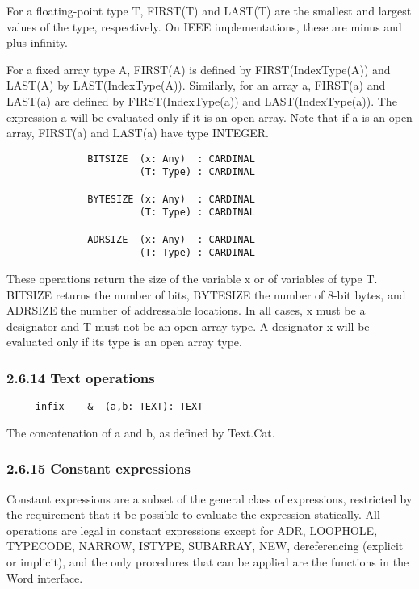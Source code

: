 \documentclass[10pt]{article}
\begin{document}
For a floating-point type T, FIRST(T) and LAST(T) are the smallest and largest
values of the type, respectively. On IEEE implementations, these are minus and
plus infinity.

For a fixed array type A, FIRST(A) is defined by FIRST(IndexType(A)) and
LAST(A) by LAST(IndexType(A)). Similarly, for an array a, FIRST(a) and LAST(a)
are defined by FIRST(IndexType(a)) and LAST(IndexType(a)). The expression a
will be evaluated only if it is an open array. Note that if a is an open
array, FIRST(a) and LAST(a) have type INTEGER.

\begin{verbatim}
              BITSIZE  (x: Any)  : CARDINAL
                       (T: Type) : CARDINAL

              BYTESIZE (x: Any)  : CARDINAL
                       (T: Type) : CARDINAL

              ADRSIZE  (x: Any)  : CARDINAL
                       (T: Type) : CARDINAL
\end{verbatim}
These operations return the size of the variable x or of variables of type
T. BITSIZE returns the number of bits, BYTESIZE the number of 8-bit bytes, and
ADRSIZE the number of addressable locations. In all cases, x must be a
designator and T must not be an open array type. A designator x will be
evaluated only if its type is an open array type.

\subsubsection*{2.6.14 Text operations}

\begin{verbatim}
     infix    &  (a,b: TEXT): TEXT
\end{verbatim}
The concatenation of a and b, as defined by Text.Cat.

\subsubsection*{2.6.15 Constant expressions}

Constant expressions are a subset of the general class of expressions,
restricted by the requirement that it be possible to evaluate the expression
statically. All operations are legal in constant expressions except for ADR,
LOOPHOLE, TYPECODE, NARROW, ISTYPE, SUBARRAY, NEW, dereferencing (explicit or
implicit), and the only procedures that can be applied are the functions in
the Word interface.
\end{document}
